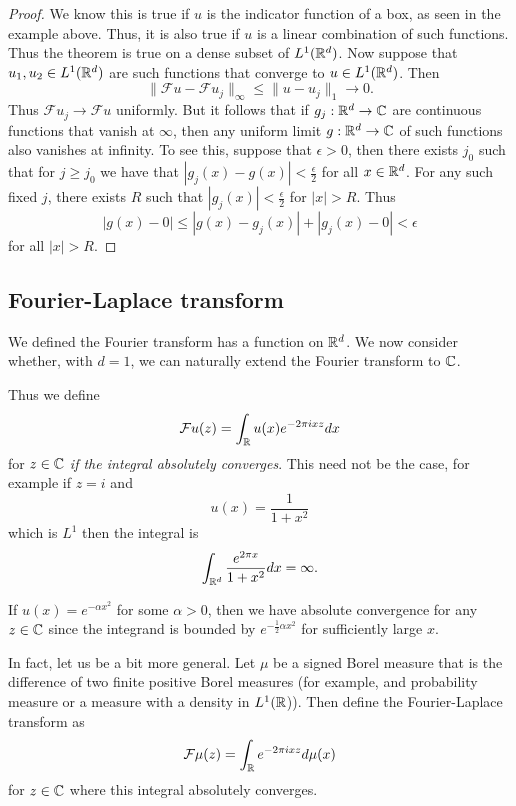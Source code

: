 \documentclass[twoside, a4paper, 10pt]{amsart}
\begin{document}
\begin{proof} We know this is true if $u$ is the indicator function of a box, as seen in the example above. Thus, it is also true if $u$ is a linear combination of such functions. Thus the theorem is true on a dense subset of $L^1(\mathbb{R}^d)$. Now suppose that $u_1, u_2 \in L^1(\mathbb{R}^d)$ are such functions that converge to $u \in L^1(\mathbb{R}^d)$. Then $$\|\mathcal{F}u - \mathcal{F}u_j \|_{\infty} \leq \|u - u_j\|_1 \to 0.$$ Thus $\mathcal{F}u_j \to \mathcal{F}u$ uniformly. But it follows that if $g_j:\mathbb{R}^d \to \mathbb{C}$ are continuous functions that vanish at $\infty$, then any uniform limit $g:\mathbb{R}^d \to \mathbb{C}$ of such functions also vanishes at infinity. To see this, suppose that $\epsilon>0$, then there exists $j_0$ such that for $j\geq j_0$ we have that $|g_j(x)-g(x)| < \frac{\epsilon}{2}$ for all $x \in \mathbb{R}^d$. For any such fixed $j$, there exists $R$ such that $|g_j(x)|< \frac{\epsilon}{2}$ for $|x|>R$. Thus $$|g(x) - 0| \leq |g(x) - g_j(x)| + |g_j(x) - 0| < \epsilon $$ for all $|x|>R$. \end{proof}

\subsection{Fourier-Laplace transform}

We defined the Fourier transform has a function on $\mathbb{R}^d$. We now consider whether, with $d=1$, we can naturally extend the Fourier transform to $\mathbb{C}$.

Thus we define $$\mathcal{F}u(z) = \int_{\mathbb{R}} u(x) e^{-2\pi i x z} dx$$ for $z \in \mathbb{C}$ \textit{if the integral absolutely converges}. This need not be the case, for example if $z=i$ and $$u(x) = \frac{1}{1+x^2}$$ which is $L^1$ then the integral is $$\int_{\mathbb{R}^d} \frac{e^{2\pi x}}{1+x^2} dx = \infty.$$

\begin{eg} If $u(x) = e^{-\alpha x^2}$ for some $\alpha >0$, then we have absolute convergence for any $z \in \mathbb{C}$ since the integrand is bounded by $e^{-\frac{1}{2}\alpha x^2}$ for sufficiently large $x$.

\end{eg}

In fact, let us be a bit more general. Let $\mu$ be a signed Borel measure that is the difference of two finite positive Borel measures (for example, and probability measure or a measure with a density in $L^1(\mathbb{R}$)). Then define the Fourier-Laplace transform as $$\mathcal{F}\mu (z) = \int_{\mathbb{R}} e^{-2\pi i x z} d\mu(x)$$ for $z \in \mathbb{C}$ where this integral absolutely converges.
\end{document}
